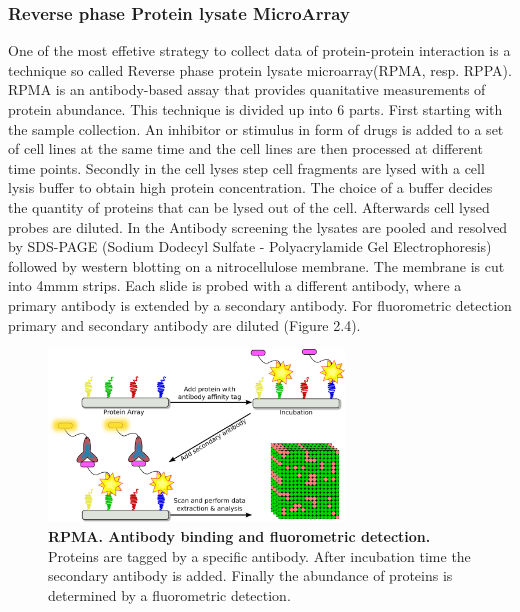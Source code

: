 \subsubsection*{Reverse phase Protein lysate MicroArray}
One of the most effetive strategy to collect data of protein-protein interaction is a technique so called Reverse phase protein lysate microarray(\gls{RPMA}, resp. RPPA). RPMA is an antibody-based assay that provides quanitative measurements of protein abundance.
This technique is divided up into 6 parts. First starting with the sample collection. An inhibitor or stimulus in form of drugs is added to a set of cell lines at the same time and the cell lines are then processed at different time points. Secondly in the cell lyses step cell fragments are lysed with a cell lysis buffer to obtain high protein concentration. The choice of a buffer decides the quantity of proteins that can be lysed out of the cell. Afterwards cell lysed probes are diluted. In the Antibody screening the lysates are pooled and resolved by \gls{SDS-PAGE} 
(Sodium Dodecyl Sulfate - Polyacrylamide Gel Electrophoresis) followed by western blotting on a nitrocellulose membrane. The membrane is cut into 4mmm strips. Each slide is probed with a different antibody, where a primary antibody is extended by a secondary antibody. For fluorometric detection primary and secondary antibody are diluted (Figure 2.4).

\begin{figure}[H]
	\captionsetup{width=0.7\linewidth}
	\centering
	\includegraphics[width=0.7\textwidth]{./Bilder/RPMA.pdf}
	\caption[RPMA: Antibody binding and fluorometric detection]{\textbf{RPMA. Antibody binding and fluorometric detection.} Proteins are tagged by a specific antibody. After incubation time the secondary antibody is added. Finally the abundance of proteins is determined by a fluorometric detection.}
	\label{fig:Fig.4}
\end{figure}

